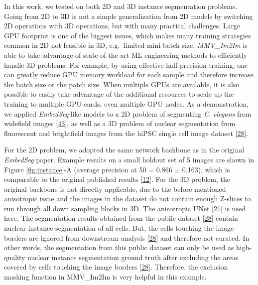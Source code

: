 In this work, we tested on both 2D and 3D instance segmentation problems. Going from 2D to 3D is not a simple generalization from 2D models by switching 2D operations with 3D operations, but with many practical challenges. Large GPU footprint is one of the biggest issues, which makes many training strategies common in 2D not feasible in 3D, e.g.~limited mini-batch size. \emph{MMV\_Im2Im} is able to take advantage of state-of-the-art ML engineering methods to efficiently handle 3D problems. For example, by using effective half-precision training, one can greatly reduce GPU memory workload for each sample and therefore increase the batch size or the patch size. When multiple GPUs are available, it is also possible to easily take advantage of the additional resources to scale up the training to multiple GPU cards, even multiple GPU nodes. As a demonstration, we applied \emph{EmbedSeg}-like models to a 2D problem of segmenting \emph{C. elegans} from widefield images {[}\protect\hyperlink{ref-138foKNOh}{43}{]}, as well as a 3D problem of nuclear segmentation from fluorescent and brightfield images from the hiPSC single cell image dataset {[}\protect\hyperlink{ref-5sGcmDuy}{28}{]}.

For the 2D problem, we adopted the same network backbone as in the original \emph{EmbedSeg} paper. Example results on a small holdout set of 5 images are shown in Figure \ref{fig:instance}-A (average precision at 50 = 0.866 ± 0.163), which is comparable to the original published results {[}\protect\hyperlink{ref-QmYuUQ5K}{12}{]}. For the 3D problem, the original backbone is not directly applicable, due to the before mentioned anisotropic issue and the images in the dataset do not contain enough Z-slices to run through all down sampling blocks in 3D. The anisotropic UNet {[}\protect\hyperlink{ref-jM3v1UjQ}{21}{]} is used here. The segmentation results obtained from the public dataset {[}\protect\hyperlink{ref-5sGcmDuy}{28}{]} contain nuclear instance segmentation of all cells. But, the cells touching the image borders are ignored from downstream analysis {[}\protect\hyperlink{ref-5sGcmDuy}{28}{]} and therefore not curated. In other words, the segmentation from this public dataset can only be used as high-quality nuclear instance segmentation ground truth after excluding the areas covered by cells touching the image borders {[}\protect\hyperlink{ref-5sGcmDuy}{28}{]}. Therefore, the exclusion masking function in MMV\_Im2Im is very helpful in this example.

